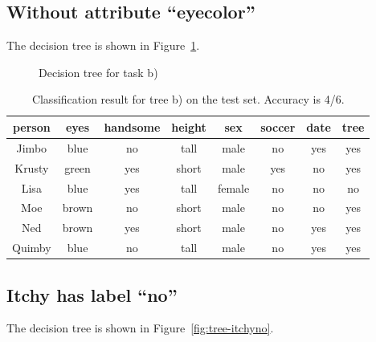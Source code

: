 \documentclass{scrartcl}
\begin{document}
\subsection{Without attribute ``eyecolor''}

The decision tree is shown in Figure~\ref{fig:tree-noeyes}.

\begin{figure}
\centering 
{}
\caption{Decision tree for task b)}
\label{fig:tree-noeyes}
\end{figure}

\begin{table}[h!]
  \centering
  \begin{tabular}{cccccc|c|c}
    \toprule
    person      & eyes  & handsome & height & sex    & soccer & date & tree\\
    \midrule
    Jimbo       & blue  & no       & tall   & male   & no     & yes & yes\\
    Krusty      & green & yes      & short  & male   & yes    & no  & yes\\
    Lisa        & blue  & yes      & tall   & female & no     & no  & no \\
    Moe         & brown & no       & short  & male   & no     & no  & yes\\
    Ned         & brown & yes      & short  & male   & no     & yes & yes\\
    Quimby      & blue  & no       & tall   & male   & no     & yes & yes\\
    \bottomrule
  \end{tabular}
  \caption{Classification result for tree b) on the test set. Accuracy is 4/6.}
\end{table}

\subsection{Itchy has label ``no''}

The decision tree is shown in Figure~\ref{fig:tree-itchyno}.
\end{document}
